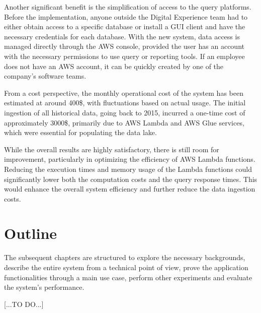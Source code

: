 Another significant benefit is the simplification of access to the query platforms. Before the implementation, anyone outside the Digital Experience team had to either obtain access to a specific database or install a GUI client and have the necessary credentials for each database. With the new system, data access is managed directly through the \ac{AWS} console, provided the user has an account with the necessary permissions to use query or reporting tools. If an employee does not have an \ac{AWS} account, it can be quickly created by one of the company's software teams.

From a cost perspective, the monthly operational cost of the system has been estimated at around 400\$, with fluctuations based on actual usage. The initial ingestion of all historical data, going back to 2015, incurred a one-time cost of approximately 3000\$, primarily due to \ac{AWS} Lambda and \ac{AWS} Glue services, which were essential for populating the data lake.

While the overall results are highly satisfactory, there is still room for improvement, particularly in optimizing the efficiency of \ac{AWS} Lambda functions. Reducing the execution times and memory usage of the Lambda functions could significantly lower both the computation costs and the query response times. This would enhance the overall system efficiency and further reduce the data ingestion costs.
\section{Outline}
The subsequent chapters are structured to explore the necessary backgrounds, describe the entire system from a technical point of view, prove the application functionalities through a main use case, perform other experiments and evaluate the system’s performance.

[...TO DO...]

